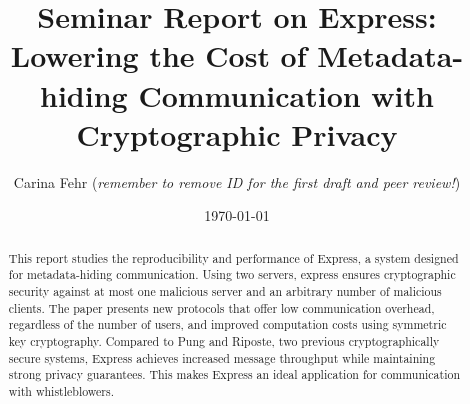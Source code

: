\documentclass[a4paper]{article}
\author{Carina Fehr (\textit{remember to remove ID for the first draft and peer review!})}
\title{Seminar Report on Express: Lowering the Cost of Metadata-hiding Communication with Cryptographic Privacy}
\date{\today}
\begin{document}
\maketitle

\begin{abstract}
This report studies the reproducibility and performance of Express, a system designed for metadata-hiding communication. Using two servers, express ensures cryptographic security against at most one malicious server and an arbitrary number of malicious clients. The paper presents new protocols that offer low communication overhead, regardless of the number of users, and improved computation costs using symmetric key cryptography. Compared to Pung and Riposte, two previous cryptographically secure systems, Express achieves increased message throughput while maintaining strong privacy guarantees. This makes Express an ideal application for communication with whistleblowers.
\end{abstract}
\end{document}
